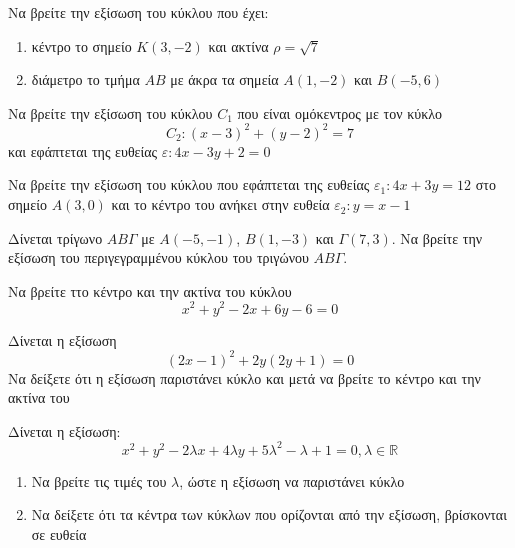 \documentclass{../../presentation}
\begin{document}
\begin{askisi}
  Να βρείτε την εξίσωση του κύκλου που έχει:
  \begin{enumerate}
    \item<1-> κέντρο το σημείο $Κ(3,-2)$ και ακτίνα $ρ=\sqrt{7}$
    \item<2-> διάμετρο το τμήμα $ΑΒ$ με άκρα τα σημεία $Α(1,-2)$ και $Β(-5,6)$
  \end{enumerate}

\end{askisi}

\begin{askisi}
  Να βρείτε την εξίσωση του κύκλου $C_1$ που είναι ομόκεντρος με τον κύκλο
  $$C_2:(x-3)^2+(y-2)^2=7$$
  και εφάπτεται της ευθείας $ε:4x-3y+2=0$

\end{askisi}

\begin{askisi}
  Να βρείτε την εξίσωση του κύκλου που εφάπτεται της ευθείας $ε_1:4x+3y=12$ στο σημείο $Α(3,0)$ και το κέντρο του ανήκει στην ευθεία $ε_2:y=x-1$

\end{askisi}

\begin{askisi}
  Δίνεται τρίγωνο $ΑΒΓ$ με $Α(-5,-1)$, $Β(1,-3)$ και $Γ(7,3)$. Να βρείτε την εξίσωση του περιγεγραμμένου κύκλου του τριγώνου $ΑΒΓ$.

\end{askisi}

\begin{askisi}
  Να βρείτε ττο κέντρο και την ακτίνα του κύκλου
  $$x^2+y^2-2x+6y-6=0$$

\end{askisi}

\begin{askisi}
  Δίνεται η εξίσωση
  $$(2x-1)^2+2y(2y+1)=0$$
  Να δείξετε ότι η εξίσωση παριστάνει κύκλο και μετά να βρείτε το κέντρο και την ακτίνα του

\end{askisi}

\begin{askisi}
  Δίνεται η εξίσωση:
  $$x^2+y^2-2λx+4λy+5λ^2-λ+1=0,λ\in\mathbb{R}$$
  \begin{enumerate}
    \item<1-> Να βρείτε τις τιμές του $λ$, ώστε η εξίσωση να παριστάνει κύκλο
    \item<2-> Να δείξετε ότι τα κέντρα των κύκλων που ορίζονται από την εξίσωση, βρίσκονται σε ευθεία
  \end{enumerate}

\end{askisi}
\end{document}
